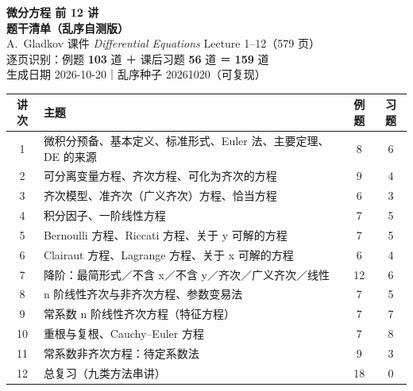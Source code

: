 \documentclass[10.5pt]{ctexart}
\begin{document}
\thispagestyle{empty}

\begin{center}
\vspace*{1.2cm}
{\color{deepblue}\Huge\bfseries 微分方程 前 12 讲}\\[6pt]
{\color{deepblue}\Huge\bfseries 题干清单（乱序自测版）}\\[14pt]
{\large A.~Gladkov 课件 \textit{Differential Equations} Lecture 1--12（579 页）}\\[4pt]
{\small 逐页识别：例题 \textbf{103} 道 ＋ 课后习题 \textbf{56} 道 ＝ \textbf{159} 道}\\[2pt]
{\small 生成日期 2026-10-20\quad｜\quad 乱序种子 20261020（可复现）}
\end{center}

\vspace{0.6cm}
\begin{center}
\renewcommand{\arraystretch}{1.25}
\small
\begin{tabular}{|c|>{\raggedright\arraybackslash}p{8.2cm}|c|c|}
\hline
\textbf{讲次} & \textbf{主题} & \textbf{例题} & \textbf{习题}\\\hline

1 & 微积分预备、基本定义、标准形式、Euler 法、主要定理、DE 的来源 & 8 & 6\\\hline

2 & 可分离变量方程、齐次方程、可化为齐次的方程 & 9 & 4\\\hline

3 & 齐次模型、准齐次（广义齐次）方程、恰当方程 & 6 & 3\\\hline

4 & 积分因子、一阶线性方程 & 7 & 5\\\hline

5 & Bernoulli 方程、Riccati 方程、关于 y 可解的方程 & 7 & 5\\\hline

6 & Clairaut 方程、Lagrange 方程、关于 x 可解的方程 & 6 & 4\\\hline

7 & 降阶：最简形式／不含 x／不含 y／齐次／广义齐次／线性 & 12 & 6\\\hline

8 & n 阶线性齐次与非齐次方程、参数变易法 & 7 & 5\\\hline

9 & 常系数 n 阶线性齐次方程（特征方程） & 7 & 7\\\hline

10 & 重根与复根、Cauchy–Euler 方程 & 7 & 8\\\hline

11 & 常系数非齐次方程：待定系数法 & 9 & 3\\\hline

12 & 总复习（九类方法串讲） & 18 & 0\\\hline

\end{tabular}
\end{center}
\end{document}
